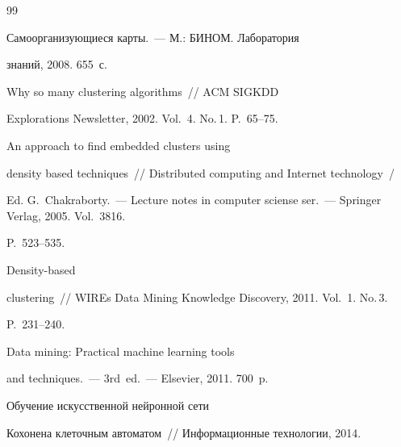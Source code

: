 {\small\frenchspacing


{%




\begin{thebibliography}{99}




 Самоорганизующиеся карты.~--- М.: БИНОМ. Лаборатория 


знаний, 2008. 655~с.




 Why so many clustering algorithms~/\!\!/ ACM SIGKDD 


Explorations Newsletter, 2002. Vol.~4. No.\,1. P.~65--75.







 An approach to find embedded clusters using 


density based techniques~/\!\!/ Distributed computing and Internet technology~/


Ed. G.~Chakraborty.~--- Lecture notes in computer sciense ser.~---  Springer Verlag, 2005. Vol.~3816.  


P.~523--535.







 Density-based 


clustering~/\!\!/ WIREs Data Mining Knowledge Discovery, 2011. Vol.~1. No.\,3. 


P.~231--240.







 Data mining: Practical machine learning tools 


and techniques.~--- 3rd~ed.~--- Elsevier, 2011. 700~p.










 Обучение искусственной нейронной сети 


Кохонена клеточным автоматом~/\!\!/ Информационные технологии, 2014. 



\end{thebibliography}}}
